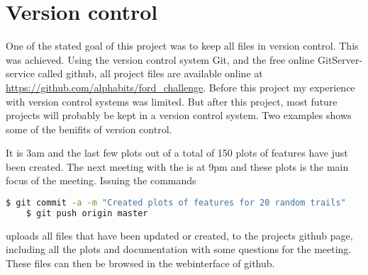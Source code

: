 \section{Version control}
One of the stated goal of this project was to keep all files in version control. This was achieved. Using the version control system Git, and the free online GitServer-service called github, all project files are available online at \url{https://github.com/alphabits/ford_challenge}. Before this project my experience with version control systems was limited. But after this project, most future projects will probably be kept in a version control system. Two examples shows some of the benifits of version control.
\begin{Exa}
    It is 3am and the last few plots out of a total of 150 plots of features have just been created. The next meeting with the  is at 9pm and these plots is the main focus of the meeting. Issuing the commands
    \begin{lstlisting}[language=bash]
    $ git commit -a -m "Created plots of features for 20 random trails"
    $ git push origin master
    \end{lstlisting}
    uploads all files that have been updated or created, to the projects github page, including all the plots and documentation with some questions for the meeting. These files can then be browsed in the webinterface of github. 
\end{Exa}
\begin{Exa}
\end{Exa}


